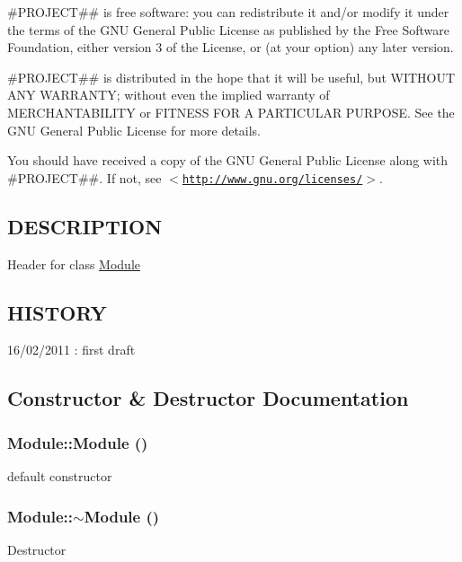 \#PROJECT\#\# is free software: you can redistribute it and/or modify it under the terms of the GNU General Public License as published by the Free Software Foundation, either version 3 of the License, or (at your option) any later version.

\#PROJECT\#\# is distributed in the hope that it will be useful, but WITHOUT ANY WARRANTY; without even the implied warranty of MERCHANTABILITY or FITNESS FOR A PARTICULAR PURPOSE. See the GNU General Public License for more details.

You should have received a copy of the GNU General Public License along with \#PROJECT\#\#. If not, see $<$\href{http://www.gnu.org/licenses/}{\tt http://www.gnu.org/licenses/}$>$.\hypertarget{d6/d40/classThread_3_01TM_01_4_DESCRIPTION}{}\subsection{DESCRIPTION}\label{d6/d40/classThread_3_01TM_01_4_DESCRIPTION}
Header for class \hyperlink{classModule}{Module}\hypertarget{d6/d40/classThread_3_01TM_01_4_HISTORY}{}\subsection{HISTORY}\label{d6/d40/classThread_3_01TM_01_4_HISTORY}
16/02/2011 : first draft 

\subsection{Constructor \& Destructor Documentation}
\hypertarget{classModule_a5a240a8a9ab1813b17bcb810b24ceaea}{
\subsubsection[{Module}]{\setlength{\rightskip}{0pt plus 5cm}Module::Module ()}}
\label{d3/d9c/classModule_a5a240a8a9ab1813b17bcb810b24ceaea}
default constructor \hypertarget{classModule_a7c9d9c096786d127590fdd8aa2b7d681}{
\subsubsection[{$\sim$Module}]{\setlength{\rightskip}{0pt plus 5cm}Module::$\sim$Module ()}}
\label{d3/d9c/classModule_a7c9d9c096786d127590fdd8aa2b7d681}
Destructor 

